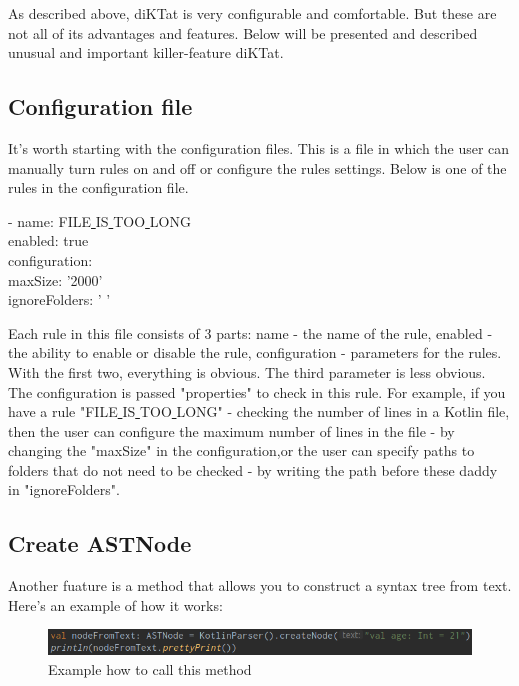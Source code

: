 \par As described above, diKTat is very configurable and comfortable. But these are not all of its advantages and features. Below will be presented and described unusual and important killer-feature diKTat.

\subsection{Configuration file}
\par
It's worth starting with the configuration files. This is a file in which the user can manually turn rules on and off or configure the rules settings. Below is one of the rules in the configuration file.
\begin{center}
- name: FILE\underline{ }IS\underline{ }TOO\underline{ }LONG\\
	enabled: true\\
	configuration:\\
	maxSize: '2000'\\
	ignoreFolders: ' '\\
\end{center}
Each rule in this file consists of 3 parts: name - the name of the rule, enabled - the ability to enable or disable the rule, configuration - parameters for the rules. With the first two, everything is obvious. The third parameter is less obvious. The configuration is passed "properties" to check in this rule. For example, if you have a rule "FILE\underline{ }IS\underline{ }TOO\underline{ }LONG" - checking the number of lines in a Kotlin file, then the user can configure the maximum number of lines in the file - by changing the "maxSize" in the configuration,or the user can specify paths to folders that do not need to be checked - by writing the path before these daddy in "ignoreFolders". \\

\subsection{Create ASTNode}
\par
Another fuature is a method that allows you to construct a syntax tree from text. Here's an example of how it works:

\begin{figure}[H]
  \centering
  \includegraphics[scale=0.5]{wp/pictures/code.png}
  \caption{Example how to call this method}   
\end{figure}

